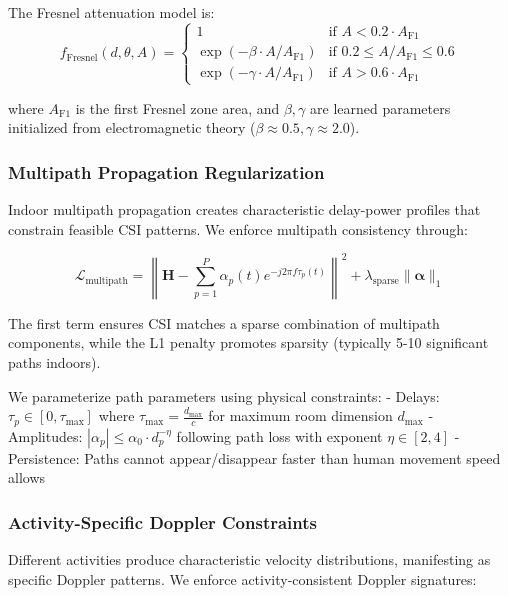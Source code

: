 \documentclass[10pt,journal,compsoc]{IEEEtran}
\begin{document}
The Fresnel attenuation model is:
\begin{equation}
f_{\text{Fresnel}}(d, \theta, A) = \begin{cases}
1 & \text{if } A < 0.2 \cdot A_{\text{F1}} \\
\exp(-\beta \cdot A/A_{\text{F1}}) & \text{if } 0.2 \leq A/A_{\text{F1}} \leq 0.6 \\
\exp(-\gamma \cdot A/A_{\text{F1}}) & \text{if } A > 0.6 \cdot A_{\text{F1}}
\end{cases}
\end{equation}

where $A_{\text{F1}}$ is the first Fresnel zone area, and $\beta, \gamma$ are learned parameters initialized from electromagnetic theory ($\beta \approx 0.5, \gamma \approx 2.0$).

\subsubsection{Multipath Propagation Regularization}

Indoor multipath propagation creates characteristic delay-power profiles that constrain feasible CSI patterns. We enforce multipath consistency through:

\begin{equation}
\mathcal{L}_{\text{multipath}} = \left\| \mathbf{H} - \sum_{p=1}^{P} \alpha_p(t) e^{-j2\pi f \tau_p(t)} \right\|^2 + \lambda_{\text{sparse}} \|\boldsymbol{\alpha}\|_1
\end{equation}

The first term ensures CSI matches a sparse combination of multipath components, while the L1 penalty promotes sparsity (typically 5-10 significant paths indoors).

We parameterize path parameters using physical constraints:
- Delays: $\tau_p \in [0, \tau_{\max}]$ where $\tau_{\max} = \frac{d_{\max}}{c}$ for maximum room dimension $d_{\max}$
- Amplitudes: $|\alpha_p| \leq \alpha_0 \cdot d_p^{-\eta}$ following path loss with exponent $\eta \in [2, 4]$
- Persistence: Paths cannot appear/disappear faster than human movement speed allows

\subsubsection{Activity-Specific Doppler Constraints}

Different activities produce characteristic velocity distributions, manifesting as specific Doppler patterns. We enforce activity-consistent Doppler signatures:
\end{document}
